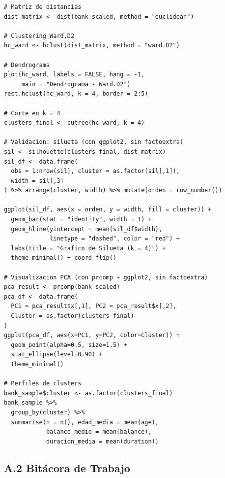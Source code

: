 \documentclass[10pt,a4paper]{article}
\begin{document}
\begin{lstlisting}[caption={Modelado: clustering jerárquico aglomerativo (Fase 4).}]
# Matriz de distancias
dist_matrix <- dist(bank_scaled, method = "euclidean")

# Clustering Ward.D2
hc_ward <- hclust(dist_matrix, method = "ward.D2")

# Dendrograma
plot(hc_ward, labels = FALSE, hang = -1,
     main = "Dendrograma - Ward.D2")
rect.hclust(hc_ward, k = 4, border = 2:5)

# Corte en k = 4
clusters_final <- cutree(hc_ward, k = 4)

# Validacion: silueta (con ggplot2, sin factoextra)
sil <- silhouette(clusters_final, dist_matrix)
sil_df <- data.frame(
  obs = 1:nrow(sil), cluster = as.factor(sil[,1]),
  width = sil[,3]
) %>% arrange(cluster, width) %>% mutate(orden = row_number())

ggplot(sil_df, aes(x = orden, y = width, fill = cluster)) +
  geom_bar(stat = "identity", width = 1) +
  geom_hline(yintercept = mean(sil_df$width),
             linetype = "dashed", color = "red") +
  labs(title = "Grafico de Silueta (k = 4)") +
  theme_minimal() + coord_flip()

# Visualizacion PCA (con prcomp + ggplot2, sin factoextra)
pca_result <- prcomp(bank_scaled)
pca_df <- data.frame(
  PC1 = pca_result$x[,1], PC2 = pca_result$x[,2],
  Cluster = as.factor(clusters_final)
)
ggplot(pca_df, aes(x=PC1, y=PC2, color=Cluster)) +
  geom_point(alpha=0.5, size=1.5) +
  stat_ellipse(level=0.90) +
  theme_minimal()

# Perfiles de clusters
bank_sample$cluster <- as.factor(clusters_final)
bank_sample %>%
  group_by(cluster) %>%
  summarise(n = n(), edad_media = mean(age),
            balance_medio = mean(balance),
            duracion_media = mean(duration))
\end{lstlisting}

\subsection*{A.2 Bitácora de Trabajo}
\end{document}
